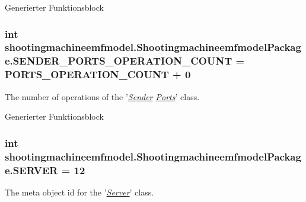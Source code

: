 Generierter Funktionsblock  \hypertarget{interfaceshootingmachineemfmodel_1_1_shootingmachineemfmodel_package_ad4c59f12e4631c8b76762f9e81227dce}{
\subsubsection[{S\-E\-N\-D\-E\-R\-\_\-\-P\-O\-R\-T\-S\-\_\-\-O\-P\-E\-R\-A\-T\-I\-O\-N\-\_\-\-C\-O\-U\-N\-T}]{\setlength{\rightskip}{0pt plus 5cm}int shootingmachineemfmodel.\-Shootingmachineemfmodel\-Package.\-S\-E\-N\-D\-E\-R\-\_\-\-P\-O\-R\-T\-S\-\_\-\-O\-P\-E\-R\-A\-T\-I\-O\-N\-\_\-\-C\-O\-U\-N\-T = {\bf P\-O\-R\-T\-S\-\_\-\-O\-P\-E\-R\-A\-T\-I\-O\-N\-\_\-\-C\-O\-U\-N\-T} + 0}}\label{interfaceshootingmachineemfmodel_1_1_shootingmachineemfmodel_package_ad4c59f12e4631c8b76762f9e81227dce}
The number of operations of the '{\itshape \hyperlink{interfaceshootingmachineemfmodel_1_1_sender}{Sender} \hyperlink{interfaceshootingmachineemfmodel_1_1_ports}{Ports}}' class.

Generierter Funktionsblock  \hypertarget{interfaceshootingmachineemfmodel_1_1_shootingmachineemfmodel_package_a508642504c7001bdf5fa4f23a286b880}{
\subsubsection[{S\-E\-R\-V\-E\-R}]{\setlength{\rightskip}{0pt plus 5cm}int shootingmachineemfmodel.\-Shootingmachineemfmodel\-Package.\-S\-E\-R\-V\-E\-R = 12}}\label{interfaceshootingmachineemfmodel_1_1_shootingmachineemfmodel_package_a508642504c7001bdf5fa4f23a286b880}
The meta object id for the '\hyperlink{classshootingmachineemfmodel_1_1impl_1_1_server_impl}{{\itshape Server}}' class.

